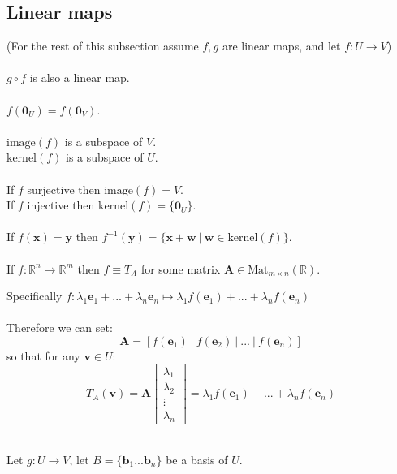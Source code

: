 \documentclass{article}
\newcommand{\R}{\mathbb{R}}
\renewcommand{\vec}[1]{\mathbf{#1}}
\begin{document}
\subsection{Linear maps}
(For the rest of this subsection assume $ f, g $ are linear maps, and let $ f : U \to V $)
\\\\
$ g \circ f $ is also a linear map.
\\\\
$ f(\vec{0}_{U}) = f(\vec{0}_{V}) $.
\\\\
$ \textrm{image}(f) $ is a subspace of $ V $.
\\
$ \textrm{kernel}(f) $ is a subspace of $ U $.
\\\\
If $ f $ surjective then $ \textrm{image}(f) = V $.
\\
If $ f $ injective then $ \textrm{kernel}(f) = \{\vec{0}_{U}\} $.
\\\\
If $ f(\vec{x}) = \vec{y} $ then $ f^{-1}(\vec{y}) = \{\vec{x} + \vec{w} \ | \ \vec{w} \in \textrm{kernel}(f) \} $.
\\\\
If $ f : \R^{n} \to \R^{m} $ then $ f \equiv T_{A} $ for some matrix $ \vec{A}  \in \textrm{Mat}_{m \times n}(\R) $.
\begin{tcolorbox}[breakable]
Specifically $ f : \lambda_{1}\vec{e}_{1} + ... + \lambda_{n}\vec{e}_{n} \mapsto \lambda_{1}f(\vec{e}_{1}) + ... + \lambda_{n}f(\vec{e}_{n}) $
\\\\
Therefore we can set:
\begin{equation}
\vec{A} = [f(\vec{e}_{1}) \ | \ f(\vec{e}_{2}) \ | \ ... \ |\  f(\vec{e}_{n})]
\end{equation}
so that for any $ \vec{v} \in U $:
\begin{equation}
T_{A}(\vec{v}) = \vec{A}
\begin{bmatrix}
\lambda_{1} \\ \lambda_{2} \\ \vdots \\ \lambda_{n}
\end{bmatrix}
= \lambda_{1}f(\vec{e}_{1}) + ... + \lambda_{n}f(\vec{e}_{n})
\end{equation}
\end{tcolorbox}
\noindent
\\
Let $ g : U \to V $, let $ B = \{\vec{b}_{1}...\vec{b}_{n}\} $ be a basis of $ U $.
\end{document}
